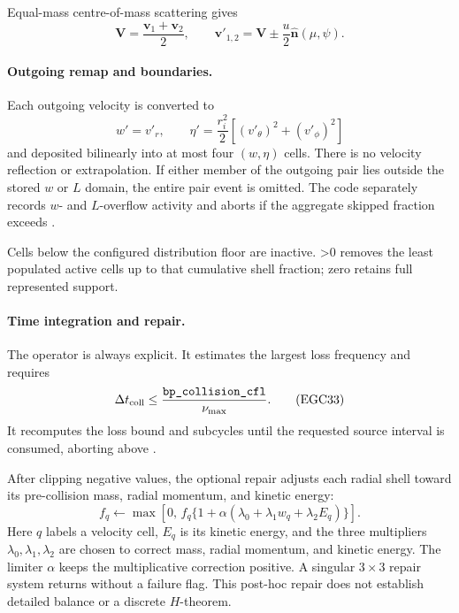 Equal-mass centre-of-mass scattering gives
\[
 \boldsymbol V=\frac{\boldsymbol v_1+\boldsymbol v_2}{2},
 \qquad
 \boldsymbol v'_{1,2}=\boldsymbol V
 \pm\frac{u}{2}\widehat{\boldsymbol n}(\mu,\psi).         \tag{EGC31}
\]

\paragraph{Outgoing remap and boundaries.}
Each outgoing velocity is converted to
\[
 w'=v'_r,\qquad
 \eta'=\frac{r_i^2}{2}\left[(v'_\theta)^2+(v'_\phi)^2\right]
                                                               \tag{EGC32}
\]
and deposited bilinearly into at most four \((w,\eta)\) cells.  There is no
velocity reflection or extrapolation.  If either member of the outgoing pair
lies outside the stored \(w\) or \(L\) domain, the entire pair event is
omitted.  The code separately records \(w\)- and \(L\)-overflow activity and
aborts if the aggregate skipped fraction exceeds
.

Cells below the configured distribution floor are inactive.
>0 removes the least populated active cells up to
that cumulative shell fraction; zero retains full represented support.

\paragraph{Time integration and repair.}
The operator is always explicit.  It estimates the largest loss frequency and
requires
\[
 \Delta t_{\rm coll}
 \le\frac{\code{bp_collision_cfl}}{\nu_{\max}}.           \tag{EGC33}
\]
It recomputes the loss bound and subcycles until the requested source interval
is consumed, aborting above .

After clipping negative values, the optional
 repair adjusts each radial shell
toward its pre-collision mass, radial momentum, and kinetic energy:
\[
 f_q\leftarrow
 \max\!\left[
 0,\,
 f_q\{1+\alpha(\lambda_0+\lambda_1w_q+\lambda_2E_q)\}
 \right].                                                \tag{EGC34}
\]
Here \(q\) labels a velocity cell, \(E_q\) is its kinetic energy, and the
three multipliers \(\lambda_0,\lambda_1,\lambda_2\) are chosen to correct
mass, radial momentum, and kinetic energy.  The limiter \(\alpha\) keeps the
multiplicative correction positive.  A
singular \(3\times3\) repair system returns without a failure flag.  This
post-hoc repair does not establish detailed balance or a discrete
\(H\)-theorem.

